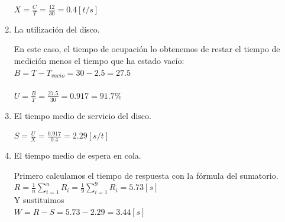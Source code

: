 \begin{enumerate}
\begin{tcolorbox}[colback=white,colframe=cyan!50!black,fonttitle=\bfseries]
$X = \frac{C}{T}=\frac{12}{30}=0.4[t/s]$
    \end{tcolorbox}
    \item La utilización del disco.
    \begin{tcolorbox}[colback=white,colframe=cyan!50!black,fonttitle=\bfseries]
    En este caso, el tiempo de ocupación lo obtenemos de restar el tiempo de medición menos el tiempo que ha estado vacío:\\ $B = T-T_{vacio} = 30-2.5=27.5$\\\\
    $U = \frac{B}{T}=\frac{27.5}{30}=0.917=91.7\%$
    \end{tcolorbox}
    \item El tiempo medio de servicio del disco.
    \begin{tcolorbox}[colback=white,colframe=cyan!50!black,fonttitle=\bfseries]
$S = \frac{U}{X}=\frac{0.917}{0.4}=2.29[s/t]$
    \end{tcolorbox}
    \item El tiempo medio de espera en cola.
    \begin{tcolorbox}[colback=white,colframe=cyan!50!black,fonttitle=\bfseries]
    Primero calculamos el tiempo de respuesta con la fórmula del sumatorio.\\
    $R = \frac{1}{n}\sum_{i=1}^{n}R_i = \frac{1}{9}\sum_{i=1}^{9}R_i=5.73[s]$\\
    Y sustituimos\\
    $W = R-S = 5.73-2.29=3.44[s]$
    \end{tcolorbox}
\end{enumerate}

